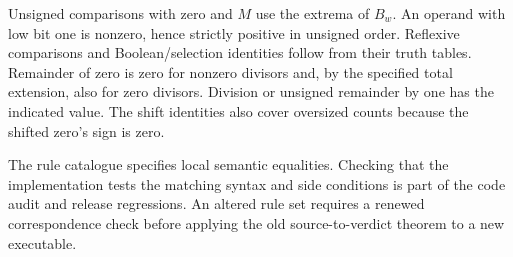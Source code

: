 Unsigned comparisons with zero and $M$ use the extrema of $B_w$. An operand with low bit one is nonzero, hence strictly positive in unsigned order. Reflexive comparisons and Boolean/selection identities follow from their truth tables. Remainder of zero is zero for nonzero divisors and, by the specified total extension, also for zero divisors. Division or unsigned remainder by one has the indicated value. The shift identities also cover oversized counts because the shifted zero's sign is zero.

The rule catalogue specifies local semantic equalities. Checking that the implementation tests the matching syntax and side conditions is part of the code audit and release regressions. An altered rule set requires a renewed correspondence check before applying the old source-to-verdict theorem to a new executable.
